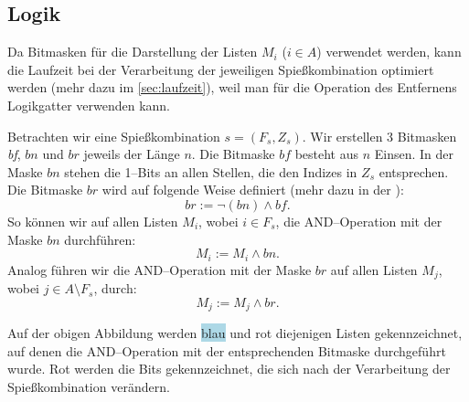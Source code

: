 \subsection{Logik}\label{sec:logik}
Da Bitmasken für die Darstellung der Listen $M_i$ ($i \in A$) verwendet werden, kann
die Laufzeit bei der Verarbeitung der jeweiligen Spießkombination optimiert werden
(mehr dazu im \cref{sec:laufzeit}),
weil man für die Operation des Entfernens Logikgatter verwenden kann.

Betrachten wir eine Spießkombination $s = (F_s, Z_s)$.
Wir erstellen 3 Bitmasken \textit{bf}, $bn$ und $br$ jeweils der Länge $n$.
Die Bitmaske $\textit{bf}$ besteht aus $n$ Einsen.
In der Maske $bn$ stehen die 1--Bits an allen Stellen, die den Indizes in $Z_s$ entsprechen.
Die Bitmaske $br$ wird auf folgende Weise definiert (mehr dazu in der ):
\[
br := \neg(bn) \land \textit{bf}.
\]
\noindent So können wir auf allen Listen $M_i$, wobei $i \in F_s$, die AND--Operation mit der Maske $bn$ 
durchführen:
\[
M_i := M_i \land bn.
\]
Analog führen wir die AND--Operation mit der Maske $br$ auf allen Listen $M_j$,
wobei $j \in A \setminus F_s$, durch:
\[
M_j := M_j \land br.
\]



Auf der obigen Abbildung werden \colorbox{lightblue}{blau} und \colorbox{lightred}{rot} diejenigen
Listen gekennzeichnet, auf denen die AND--Operation mit der entsprechenden Bitmaske durchgeführt wurde.
{\color{red} Rot} werden die Bits gekennzeichnet, die sich nach der Verarbeitung der Spießkombination verändern.


